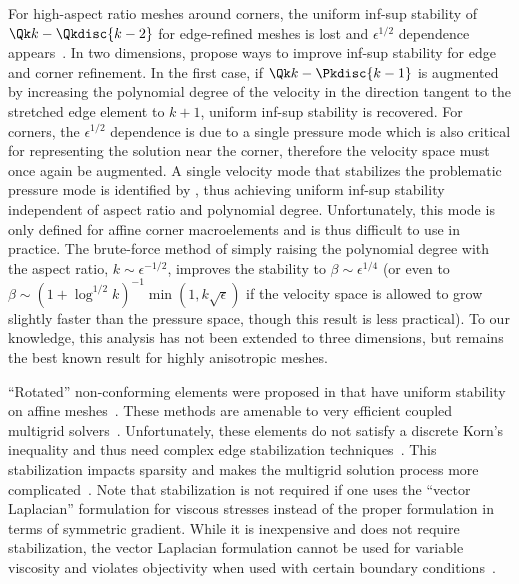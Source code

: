 For high-aspect ratio meshes around corners, the uniform inf-sup stability of $\Qk k - \Qkdisc{k-2}$ for edge-refined meshes is lost and $\epsilon^{1/2}$ dependence appears~\citep{schotzau1998mhf}.
In two dimensions, \citet{ainsworth2000smh} propose ways to improve inf-sup stability for edge and corner refinement.
In the first case, if $\Qk k - \Pkdisc{k-1}$ is augmented by increasing the polynomial degree of the velocity in the direction tangent to the stretched edge element to $k+1$, uniform inf-sup stability is recovered.
For corners, the $\epsilon^{1/2}$ dependence is due to a single pressure mode which is also critical for representing the solution near the corner, therefore the velocity space must once again be augmented.
A single velocity mode that stabilizes the problematic pressure mode is identified by \citet{ainsworth2000smh}, thus achieving uniform inf-sup stability independent of aspect ratio and polynomial degree.
Unfortunately, this mode is only defined for affine corner macroelements and is thus difficult to use in practice.
The brute-force method of simply raising the polynomial degree with the aspect ratio, $k \sim \epsilon^{-1/2}$, improves the stability to $\beta \sim \epsilon^{1/4}$ (or even to $\beta \sim (1+\log^{1/2}k)^{-1} \min(1,k\sqrt\epsilon)$ if the velocity space is allowed to grow slightly faster than the pressure space, though this result is less practical).
To our knowledge, this analysis has not been extended to three dimensions, but remains the best known result for highly anisotropic meshes.

``Rotated'' non-conforming elements were proposed in \citet{rannacher1992simple} that have uniform stability on affine meshes~\citep{becker1994finite}.
These methods are amenable to very efficient coupled multigrid solvers~\citep{rannacher2000finite}.
Unfortunately, these elements do not satisfy a discrete Korn's inequality and thus need complex edge stabilization techniques~\citep{brenner2004korn,turek2007unified}.
This stabilization impacts sparsity and makes the multigrid solution process more complicated~\citep{turek2002multigrid,ouazzi2006efficient}.
Note that stabilization is not required if one uses the ``vector Laplacian'' formulation for viscous stresses instead of the proper formulation in terms of symmetric gradient.
While it is inexpensive and does not require stabilization, the vector Laplacian formulation cannot be used for variable viscosity and violates objectivity when used with certain boundary conditions~\citep{limache2008objectivity}.
